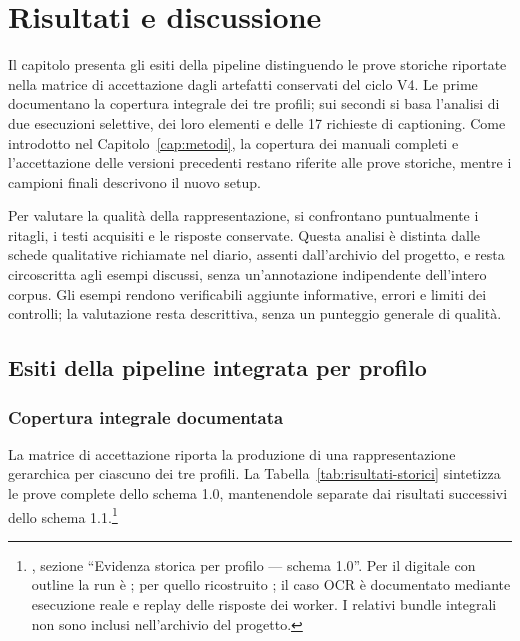 \chapter{Risultati e discussione}
\label{cap:risultati}

Il capitolo presenta gli esiti della pipeline distinguendo le prove storiche riportate nella matrice di accettazione dagli artefatti conservati del ciclo V4. Le prime documentano la copertura integrale dei tre profili; sui secondi si basa l'analisi di due esecuzioni selettive, dei loro elementi e delle 17 richieste di captioning. Come introdotto nel Capitolo~\ref{cap:metodi}, la copertura dei manuali completi e l'accettazione delle versioni precedenti restano riferite alle prove storiche, mentre i campioni finali descrivono il nuovo setup.

Per valutare la qualità della rappresentazione, si confrontano puntualmente i ritagli, i testi acquisiti e le risposte conservate. Questa analisi è distinta dalle schede qualitative richiamate nel diario, assenti dall'archivio del progetto, e resta circoscritta agli esempi discussi, senza un'annotazione indipendente dell'intero corpus. Gli esempi rendono verificabili aggiunte informative, errori e limiti dei controlli; la valutazione resta descrittiva, senza un punteggio generale di qualità.

\section{Esiti della pipeline integrata per profilo}
\label{sec:risultati-struttura}

\subsection{Copertura integrale documentata}

La matrice di accettazione riporta la produzione di una rappresentazione gerarchica per ciascuno dei tre profili. La Tabella~\ref{tab:risultati-storici} sintetizza le prove complete dello schema 1.0, mantenendole separate dai risultati successivi dello schema 1.1.\footnote{\raggedright {}, sezione ``Evidenza storica per profilo --- schema 1.0''. Per il digitale con outline la run è ; per quello ricostruito ; il caso OCR è documentato mediante esecuzione reale e replay delle risposte dei worker. I relativi bundle integrali non sono inclusi nell'archivio del progetto.}

